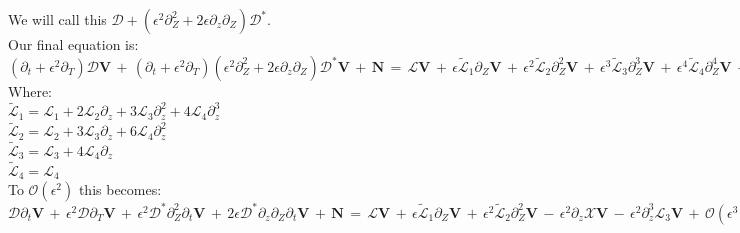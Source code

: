 \documentclass[letterpaper,12pt]{article}
\begin{document}
\vspace{2mm}

We will call this $\mathcal{D} + \left(\epsilon^2\partial_Z^2 + 2\epsilon\partial_z\partial_Z\right)\mathcal{D^*}$. \\

Our final equation is: \\

$\left(\partial_t + \epsilon^2 \partial_T \right)\mathcal{D}\mathbf{V} \, + \, \left(\partial_t + \epsilon^2\partial_T\right)\left(\epsilon^2\partial_Z^2 + 2\epsilon\partial_z\partial_Z\right)\mathcal{D^*}\mathbf{V} \, + \, \mathbf{N} \, = \, \mathcal{L}\mathbf{V} \, + \, \epsilon\widetilde{\mathcal{L}}_1\partial_Z\mathbf{V} \, + \, \epsilon^2\widetilde{\mathcal{L}}_2\partial_Z^2\mathbf{V} \, + \, \epsilon^3\widetilde{\mathcal{L}}_3\partial_Z^3\mathbf{V} \, + \, \epsilon^4\widetilde{\mathcal{L}}_4\partial_Z^4\mathbf{V} \, - \, \epsilon^2\partial_z\mathcal{X}\mathbf{V} \, - \epsilon^3\partial_Z\mathcal{X}\mathbf{V} \, - \, \epsilon^2\partial_z^3\mathcal{L}_3\mathbf{V} \, - \, 3\epsilon^3\partial_z^2\partial_Z\mathcal{L}_3\mathbf{V} \, - \, 3\epsilon^4\partial_z\partial_Z^2\mathcal{L}_3\mathbf{V} \, - \, \epsilon^5\partial_Z^3\mathcal{L}_3\mathbf{V}$ \\

Where: \\

$\widetilde{\mathcal{L}}_1 = \mathcal{L}_1 + 2\mathcal{L}_2\partial_z + 3\mathcal{L}_3\partial_z^2 + 4\mathcal{L}_4\partial_z^3$ \\

$\widetilde{\mathcal{L}}_2 = \mathcal{L}_2 + 3\mathcal{L}_3\partial_z + 6\mathcal{L}_4\partial_z^2$ \\

$\widetilde{\mathcal{L}}_3 = \mathcal{L}_3 + 4\mathcal{L}_4\partial_z$ \\

$\widetilde{\mathcal{L}}_4 = \mathcal{L}_4$ \\

To $\mathcal{O}(\epsilon^2)$ this becomes: \\

$\mathcal{D}\partial_t\mathbf{V} \, + \, \epsilon^2  \mathcal{D}\partial_T\mathbf{V} \, + \, \epsilon^2\mathcal{D^*}\partial_Z^2\partial_t\mathbf{V} \, + \, 2\epsilon\mathcal{D^*}\partial_z\partial_Z\partial_t\mathbf{V} \, + \, \mathbf{N} \, = \, \mathcal{L}\mathbf{V} \, + \, \epsilon\widetilde{\mathcal{L}}_1\partial_Z\mathbf{V} \, + \, \epsilon^2\widetilde{\mathcal{L}}_2\partial_Z^2\mathbf{V} \, - \, \epsilon^2\partial_z\mathcal{X}\mathbf{V} \, - \, \epsilon^2\partial_z^3\mathcal{L}_3\mathbf{V} \, + \, \mathcal{O}(\epsilon^3)$ \\
\end{document}
